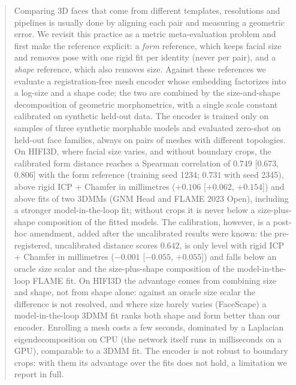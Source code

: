 \documentclass[10pt,twocolumn,letterpaper]{article}
\begin{document}
\begin{abstract}
Comparing 3D faces that come from different templates, resolutions and pipelines is usually done by aligning each pair and measuring a geometric error. We revisit this practice as a metric meta-evaluation problem and first make the reference explicit: a \emph{form} reference, which keeps facial size and removes pose with one rigid fit per identity (never per pair), and a \emph{shape} reference, which also removes size. Against these references we evaluate a registration-free mesh encoder whose embedding factorizes into a log-size and a shape code; the two are combined by the size-and-shape decomposition of geometric morphometrics, with a single scale constant calibrated on synthetic held-out data. The encoder is trained only on samples of three synthetic morphable models and evaluated zero-shot on held-out face families, always on pairs of meshes with different topologies. On HIFI3D, where facial size varies, and without boundary crops, the calibrated form distance reaches a Spearman correlation of $0.749$ [$0.673$, $0.806$] with the form reference (training seed 1234; $0.731$ with seed 2345), above rigid ICP + Chamfer in millimetres ($+0.106$ [$+0.062$, $+0.154$]) and above fits of two 3DMMs (GNM Head and FLAME 2023 Open), including a stronger model-in-the-loop fit; without crops it is never below a size-plus-shape composition of the fitted models. The calibration, however, is a post-hoc amendment, added after the uncalibrated results were known: the pre-registered, uncalibrated distance scores $0.642$, is only level with rigid ICP + Chamfer in millimetres ($-0.001$ [$-0.055$, $+0.055$]) and falls below an oracle size scalar and the size-plus-shape composition of the model-in-the-loop FLAME fit. On HIFI3D the advantage comes from combining size and shape, not from shape alone: against an oracle size scalar the difference is not resolved, and where size barely varies (FaceScape) a model-in-the-loop 3DMM fit ranks both shape and form better than our encoder. Enrolling a mesh costs a few seconds, dominated by a Laplacian eigendecomposition on CPU (the network itself runs in milliseconds on a GPU), comparable to a 3DMM fit. The encoder is not robust to boundary crops: with them its advantage over the fits does not hold, a limitation we report in full.


\end{abstract}
\end{document}
